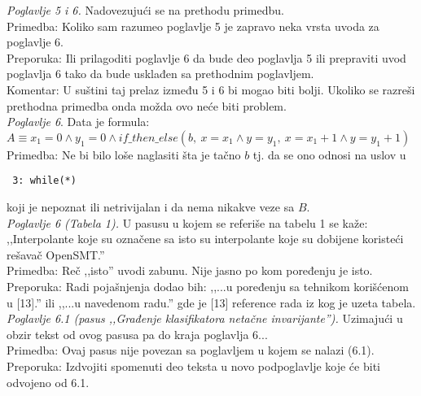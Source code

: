 \documentclass[a4paper]{report}
\begin{document}
\textit{Poglavlje 5 i 6.} Nadovezujući se na prethodu primedbu. \\
\indent Primedba: Koliko sam razumeo poglavlje 5 je zapravo neka vrsta uvoda za poglavlje 6. \\
\indent Preporuka: Ili prilagoditi poglavlje 6 da bude deo poglavlja 5 ili prepraviti uvod poglavlja 6 tako da bude usklađen sa prethodnim poglavljem. \\
\indent Komentar: U suštini taj prelaz između 5 i 6 bi mogao biti bolji. Ukoliko se razreši prethodna primedba onda možda ovo neće biti problem. \\

\textit{Poglavlje 6}. Data je formula: \\ 
$A \equiv x_1 = 0 \land y_1 = 0 \land if\_then\_else(b,\ x = x_1 \land y = y_1,\ x = x_1 + 1 \land y = y_1 + 1)$ \\
\indent Primedba: Ne bi bilo loše naglasiti šta je tačno $b$ tj. da se ono odnosi na uslov u \begin{verbatim} 3: while(*) \end{verbatim} koji je nepoznat ili netrivijalan i da nema nikakve veze sa $B$. \\

\textit{Poglavlje 6 (Tabela 1).} U pasusu u kojem se referiše na tabelu 1 se kaže: ,,Interpolante koje su označene sa isto su interpolante koje su dobijene koristeći rešavač OpenSMT.'' \\
\indent Primedba: Reč ,,isto'' uvodi zabunu. Nije jasno po kom poređenju je isto. \\
\indent Preporuka: Radi pojašnjenja dodao bih: ,,...u poređenju sa tehnikom korišćenom u [13].'' ili ,,...u navedenom radu.'' gde je [13] reference rada iz kog je uzeta tabela. \\

\textit{Poglavlje 6.1 (pasus ,,Građenje klasifikatora netačne invarijante'').} Uzimajući u obzir tekst od ovog pasusa pa do kraja poglavlja 6... \\
\indent Primedba: Ovaj pasus nije povezan sa poglavljem u kojem se nalazi (6.1). \\
\indent Preporuka: Izdvojiti spomenuti deo teksta u novo podpoglavlje koje će biti odvojeno od 6.1. \\
\end{document}
